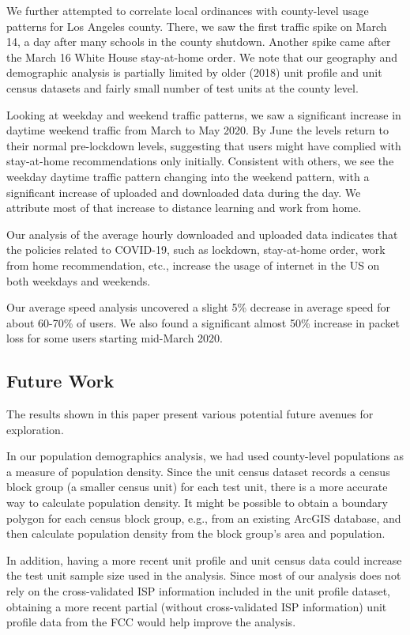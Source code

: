 \documentclass[conference,10pt]{IEEEtran}
\begin{document}
We further attempted to correlate local ordinances with county-level usage patterns for Los Angeles county. There, we saw the first traffic spike on March 14, a day after many schools in the county shutdown. Another spike came after the March 16 White House stay-at-home order. We note that our geography and demographic analysis is partially limited by older (2018) unit profile and unit census datasets and fairly small number of test units at the county level.

Looking at weekday and weekend traffic patterns, we saw a significant increase in daytime weekend traffic from March to May 2020. By June the levels return to their normal pre-lockdown levels, suggesting that users might have complied with stay-at-home recommendations only initially. Consistent with others, we see the weekday daytime traffic pattern changing into the weekend pattern, with a significant increase of uploaded and downloaded data during the day. We attribute most of that increase to distance learning and work from home.

Our analysis of the average hourly downloaded and uploaded data indicates that the policies related to COVID-19, such as lockdown, stay-at-home order, work from home recommendation, etc., increase the usage of internet in the \gls{US} on both weekdays and weekends.

Our average speed analysis uncovered a slight 5\% decrease in average speed for about 60-70\% of users. We also found a significant almost 50\% increase in packet loss for some users starting mid-March 2020.

\subsection{Future Work}\label{sec:future-work}

The results shown in this paper present various potential future avenues for exploration.

In our population demographics analysis, we had used county-level populations as a measure of population density. Since the unit census dataset records a census block group (a smaller census unit) for each test unit, there is a more accurate way to calculate population density. It might be possible to obtain a boundary polygon for each census block group, e.g., from an existing ArcGIS database, and then calculate population density from the block group's area and population.

In addition, having a more recent unit profile and unit census data could increase the test unit sample size used in the analysis. Since most of our analysis does not rely on the cross-validated \gls{ISP} information included in the unit profile dataset, obtaining a more recent partial (without cross-validated \gls{ISP} information) unit profile data from the \gls{FCC} would help improve the analysis.
\end{document}
